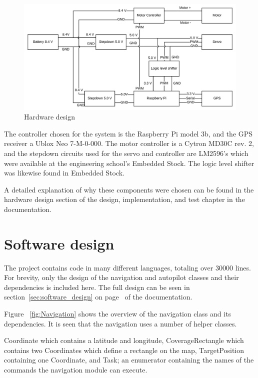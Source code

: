 \begin{figure}[H]
\centering
\includegraphics[width=1\linewidth]{Hardware_design}
\caption{Hardware design}
\label{fig:hardware_design}
\end{figure}

The controller chosen for the system is the Raspberry Pi model 3b, and the GPS receiver a Ublox Neo 7-M-0-000. The motor controller is a Cytron MD30C rev. 2, and the stepdown circuits used for the servo and controller are LM2596's which were available at the engineering school's Embedded Stock. The logic level shifter was likewise found in Embedded Stock.

A detailed explanation of why these components were chosen can be found in the hardware design section of the design, implementation, and test chapter in the documentation.

\section{Software design}
The project contains code in many different languages, totaling over 30000 lines. For brevity, only the design of the navigation and autopilot classes and their dependencies is included here. The full design can be seen in section~\ref{sec:software_design} on page~\pageref{sec:software_design} of the documentation.

Figure ~\ref{fig:Navigation} shows the overview of the navigation class and its dependencies. It is seen that the navigation uses a number of helper classes.

Coordinate which contains a latitude and longitude, CoverageRectangle which contains two Coordinates which define a rectangle on the map, TargetPosition containing one Coordinate, and Task; an enumerator containing the names of the commands the navigation module can execute.

